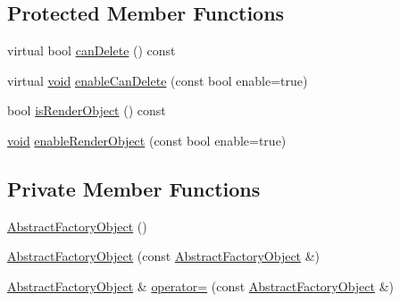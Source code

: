 \subsection*{Protected Member Functions}
\begin{DoxyCompactItemize}
\item 
virtual bool \mbox{\hyperlink{classnjli_1_1_abstract_factory_object_aaa088eb7160046ccf467c0f29f509291}{can\+Delete}} () const
\item 
virtual \mbox{\hyperlink{_thread_8h_af1e856da2e658414cb2456cb6f7ebc66}{void}} \mbox{\hyperlink{classnjli_1_1_abstract_factory_object_a678b8f28320f6a7e2aa38d5ef72889a8}{enable\+Can\+Delete}} (const bool enable=true)
\item 
bool \mbox{\hyperlink{classnjli_1_1_abstract_factory_object_a75e5bb1d52f364d303a0a38617639649}{is\+Render\+Object}} () const
\item 
\mbox{\hyperlink{_thread_8h_af1e856da2e658414cb2456cb6f7ebc66}{void}} \mbox{\hyperlink{classnjli_1_1_abstract_factory_object_a87597409cecc91b4d40be5e9b3a2d4dc}{enable\+Render\+Object}} (const bool enable=true)
\end{DoxyCompactItemize}
\subsection*{Private Member Functions}
\begin{DoxyCompactItemize}
\item 
\mbox{\hyperlink{classnjli_1_1_abstract_factory_object_a4f7ae7bf09c7c9426e7d6023f7fd8dec}{Abstract\+Factory\+Object}} ()
\item 
\mbox{\hyperlink{classnjli_1_1_abstract_factory_object_a171f8eecedafbe703fd27d2cf9e51f9f}{Abstract\+Factory\+Object}} (const \mbox{\hyperlink{classnjli_1_1_abstract_factory_object}{Abstract\+Factory\+Object}} \&)
\item 
\mbox{\hyperlink{classnjli_1_1_abstract_factory_object}{Abstract\+Factory\+Object}} \& \mbox{\hyperlink{classnjli_1_1_abstract_factory_object_ae2c1cfc2cf1b38931ac450e2598a6bb9}{operator=}} (const \mbox{\hyperlink{classnjli_1_1_abstract_factory_object}{Abstract\+Factory\+Object}} \&)
\end{DoxyCompactItemize}
